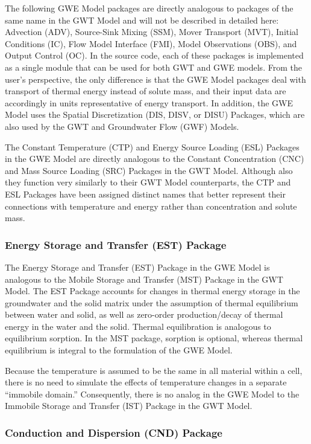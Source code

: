 The following GWE Model packages are directly analogous to packages of the same name in the GWT Model and will not be described in detailed here: Advection (ADV), Source-Sink Mixing (SSM), Mover Transport (MVT), Initial Conditions (IC), Flow Model Interface (FMI), Model Observations (OBS), and Output Control (OC). In the \mf source code, each of these packages is implemented as a single module that can be used for both GWT and GWE models. From the user's perspective, the only difference is that the GWE Model packages deal with transport of thermal energy instead of solute mass, and their input data are accordingly in units representative of energy transport. In addition, the GWE Model uses the Spatial Discretization (DIS, DISV, or DISU) Packages, which are also used by the GWT and Groundwater Flow (GWF) Models.

The Constant Temperature (CTP) and Energy Source Loading (ESL) Packages in the GWE Model are directly analogous to the Constant Concentration (CNC) and Mass Source Loading (SRC) Packages in the GWT Model. Although also they function very similarly to their GWT Model counterparts, the CTP and ESL Packages have been assigned distinct names that better represent their connections with temperature and energy rather than concentration and solute mass.

\subsubsection{Energy Storage and Transfer (EST) Package}

The Energy Storage and Transfer (EST) Package in the GWE Model is analogous to the Mobile Storage and Transfer (MST) Package in the GWT Model. The EST Package accounts for changes in thermal energy storage in the groundwater and the solid matrix under the assumption of thermal equilibrium between water and solid, as well as zero-order production/decay of thermal energy in the water and the solid. Thermal equilibration is analogous to equilibrium sorption. In the MST package, sorption is optional, whereas thermal equilibrium is integral to the formulation of the GWE Model.

Because the temperature is assumed to be the same in all material within a cell, there is no need to simulate the effects of temperature changes in a separate ``immobile domain.'' Consequently, there is no analog in the GWE Model to the Immobile Storage and Transfer (IST) Package in the GWT Model.

\subsubsection{Conduction and Dispersion (CND) Package}

